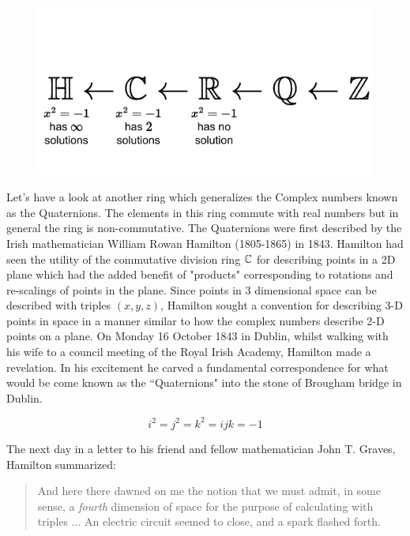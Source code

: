 \begin{figure}[h!]
    \centering
    \includegraphics{Figures/Quaternions_xsquared_solns.pdf}
    \label{fig:x_squared_solns}
\end{figure}
\newpage
Let's have a look at another ring which generalizes the Complex numbers known as the Quaternions. The elements in this ring commute with real numbers but in general the ring is non-commutative. The Quaternions were first described by the Irish mathematician William Rowan Hamilton (1805-1865) in 1843. Hamilton had seen the utility of the commutative division ring ${\mathbb{ C}}$ for describing points in a 2D plane which had the added benefit of "products" corresponding to rotations and re-scalings of points in the plane. Since points in 3 dimensional space can be described with triples $(x,y,z)$, Hamilton sought a convention for describing 3-D points in space in a manner similar to how the complex numbers describe 2-D points on a plane. On Monday 16 October 1843 in Dublin, whilst walking with his wife to a council meeting of the Royal Irish Academy, Hamilton made a revelation. In his excitement he carved a fundamental correspondence for what would be come known as the ``Quaternions" into the stone of Brougham bridge in Dublin. 
\begin{center}
    \begin{equation}
        i^2=j^2=k^2=ijk=-1 \nonumber
    \end{equation}
\end{center}
The next day in a letter to his friend and fellow mathematician John T. Graves, Hamilton summarized:
\begin{quote}
    And here there dawned on me the notion that we must admit, in some sense, a \textit{fourth} dimension of space for the purpose of calculating with triples ... An electric circuit seemed to close, and a spark flashed forth.
\end{quote}
